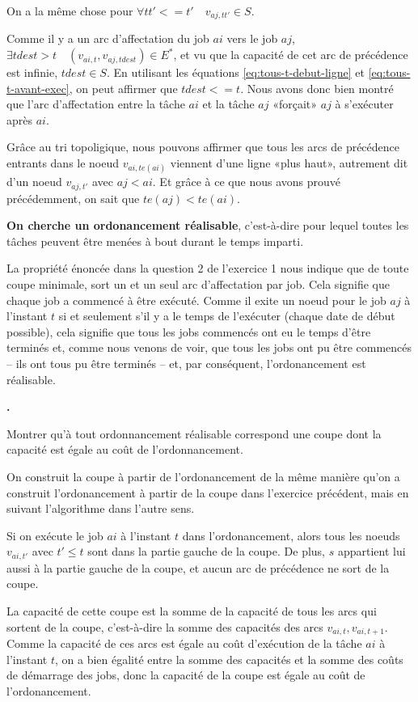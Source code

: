\documentclass{article}
\newcounter{enoncecount}
\newenvironment{enonce}
{
\stepcounter{enoncecount}
\bf\small \arabic{enoncecount}.
\begin{bf}
}
{
\end{bf}
}
\begin{document}
On a la même chose pour $\forall tt' <= t' \quad v_{aj,tt'} \in S$.

Comme il y a un arc d'affectation du job $ai$ vers le job $aj$, $\exists tdest > t \quad (v_{ai,t},v_{aj,tdest}) \in E^*$, et vu que la
capacité de cet arc de précédence est infinie, $tdest \in S$. En utilisant les équations \ref{eq:tous-t-debut-ligne} et
\ref{eq:tous-t-avant-exec}, on peut affirmer que $tdest <= t$. Nous avons donc bien montré que l'arc d'affectation entre la tâche $ai$ et la
tâche $aj$ «forçait» $aj$ à s'exécuter après $ai$.

Grâce au tri topoligique, nous pouvons affirmer que tous les arcs de précédence entrants dans le noeud $v_{ai,te(ai)}$ viennent d'une ligne
«plus haut», autrement dit d'un noeud $v_{aj,t'}$ avec $aj < ai$. Et grâce à ce que nous avons prouvé précédemment,
on sait que $te(aj) < te(ai)$.

\textbf{On cherche un ordonancement réalisable}, c'est-à-dire pour lequel
toutes les tâches peuvent être menées à bout durant le temps
imparti.

La propriété énoncée dans la question 2 de l'exercice 1 nous indique que de toute coupe minimale, sort un et un seul arc d'affectation par
job. Cela signifie que chaque job a commencé à être exécuté. Comme il exite un noeud pour le job $aj$ à l'instant $t$ si et seulement s'il y
a le temps de l'exécuter ( chaque date de début possible\fg), cela signifie que tous les jobs commencés ont eu le temps d'être terminés
et, comme nous venons de voir, que tous les jobs ont pu être commencés -- ils ont tous pu être terminés -- et, par conséquent,
l'ordonancement est réalisable.

\begin{enonce}
Montrer qu'à tout ordonnancement réalisable correspond une coupe dont la capacité est égale au coût de l'ordonnancement.
\end{enonce}

On construit la coupe à partir de l'ordonancement de la même manière
qu'on a construit l'ordonancement à partir de la coupe dans l'exercice
précédent, mais en suivant l'algorithme dans l'autre sens.

Si on exécute le job $ai$ à l'instant $t$ dans l'ordonancement, alors
tous les noeuds $v_{ai,t'}$ avec $t' \leq t$ sont dans la partie \og
gauche\fg{} de la coupe. De plus, $s$ appartient lui aussi à la partie
gauche de la coupe, et aucun arc de précédence ne sort de la coupe.

La capacité de cette coupe est la somme de la capacité de tous les
arcs qui sortent de la coupe, c'est-à-dire la somme des capacités des
arcs $v_{ai,t}, v_{ai,t+1}$. Comme la capacité de ces arcs est égale au
coût d'exécution de la tâche $ai$ à l'instant $t$, on a bien égalité entre
la somme des capacités et la somme des coûts de démarrage des jobs,
donc la capacité de la coupe est égale au coût de l'ordonancement.
\end{document}
